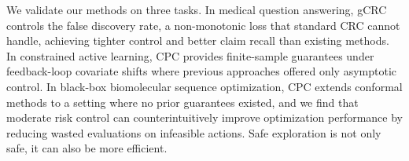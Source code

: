 
We validate our methods on three tasks. In medical question answering, gCRC controls the false discovery rate, a non-monotonic loss that standard CRC cannot
  handle, achieving tighter control and better claim recall than existing methods. In constrained active learning, CPC provides finite-sample guarantees under
  feedback-loop covariate shifts where previous approaches offered only asymptotic control. In black-box biomolecular sequence optimization, CPC extends conformal
  methods to a setting where no prior guarantees existed, and we find that moderate risk control can counterintuitively improve optimization performance by reducing
   wasted evaluations on infeasible actions. Safe exploration is not only safe, it can also be more efficient.
